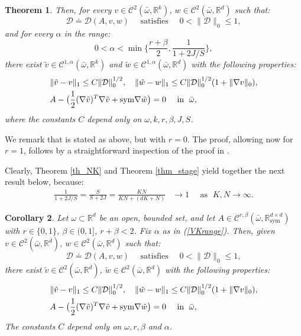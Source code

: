 \documentclass[reqno,twoside,11pt]{amsart}
\newcommand{\sym}{\mathrm{sym}}
\newcommand{\R}{\mathbb{R}}
\numberwithin{equation}{section}
\theoremstyle{plain}
\newtheorem{theorem}{Theorem}[section]
\newtheorem{corollary}[theorem]{Corollary}
\theoremstyle{definition}
\begin{document}
\begin{theorem}
Then, for every $v\in\mathcal{C}^2(\bar\omega,\R^k)$,
$w\in\mathcal{C}^2(\bar\omega,\R^d)$ such that:
$$\mathcal{D}\doteq \mathcal{D}(A, v,w) \quad \mbox{ satisfies } \quad 0<
\|\mathcal{D}\big\|_0\leq 1,$$
and for every $\alpha$ in the range:
\begin{equation*}
0< \alpha <\min\Big\{\frac{r+\beta}{2},\frac{1}{1+2J/S}\Big\},
\end{equation*}
there exist $\tilde v\in\mathcal{C}^{1,\alpha}(\bar\omega,\R^k)$ and
$\tilde w\in\mathcal{C}^{1,\alpha}(\bar\omega,\R^d)$ with the following properties:
\begin{align*}
& \|\tilde v - v\|_1\leq C\|\mathcal{D}\|_0^{1/2}, \quad \|\tilde w -
w\|_1\leq C\|\mathcal{D}\|_0^{1/2}(1+\|\nabla v\|_0), \vspace{1mm}\\
& A-\big(\frac{1}{2}(\nabla \tilde v)^T\nabla \tilde v + \sym\nabla
\tilde w\big) =0 \quad\mbox{ in }\; \bar\omega, 
\end{align*}
where the constants $C$ depend only on $\omega, k, r,\beta, J, S$.
\end{theorem}

\noindent We remark that \cite[Theorem 5.1]{lew_conv} is stated as above, but
with $r=0$. The proof, allowing now for $r=1$, follows by
a straightforward inspection of the proof in \cite{lew_conv}. 

\medskip

\noindent Clearly, Theorem \ref{th_NK} and Theorem \ref{thm_stage} yield together
the next result below, because:
\begin{equation*}
\begin{split}
\frac{1}{1+2J/S} = \frac{S}{S+2J} = \frac{KN}{KN+ (dK+N)} & \to
1\quad \mbox{ as } \; K, N\to\infty.
\end{split}
\end{equation*}

\medskip

\begin{corollary}\label{th_NKH}
Let $\omega\subset\R^d$ be an open, bounded set, and
let $A\in\mathcal{C}^{r,\beta}(\bar\omega, \R^{d\times d}_\sym)$ with
$r\in \{0,1\}$, $\beta\in (0,1]$, $r+\beta<2$.
Fix $\alpha$ as in (\ref{VKrange}).
Then, given $v\in\mathcal{C}^2(\bar\omega,\R^{\bar d})$, $w\in\mathcal{C}^2(\bar\omega,\R^d)$
such that:
$$\mathcal{D}\doteq\mathcal{D}(A,v,w) \quad\mbox{ satisfies } \quad 0<\|\mathcal{D}\|_0\leq 1,$$
there exist  $\tilde v\in\mathcal{C}^2(\bar\omega,\R^{\bar d})$,
$\tilde w\in\mathcal{C}^2(\bar\omega,\R^d)$
with the following properties:
\begin{align*}
& \|\tilde v - v\|_1\leq C\|\mathcal{D}\|_0^{1/2}, \quad \|\tilde w -
w\|_1\leq C\|\mathcal{D}\|_0^{1/2}(1+\|\nabla v\|_0), \vspace{1mm}\\
& A-\big(\frac{1}{2}(\nabla \tilde v)^T\nabla \tilde v + \sym\nabla
\tilde w\big) =0 \quad\mbox{ in }\; \bar\omega, 
\end{align*}
The constants $C$ depend only
on $\omega, r, \beta$ and $\alpha$. 
\end{corollary}
\end{document}
